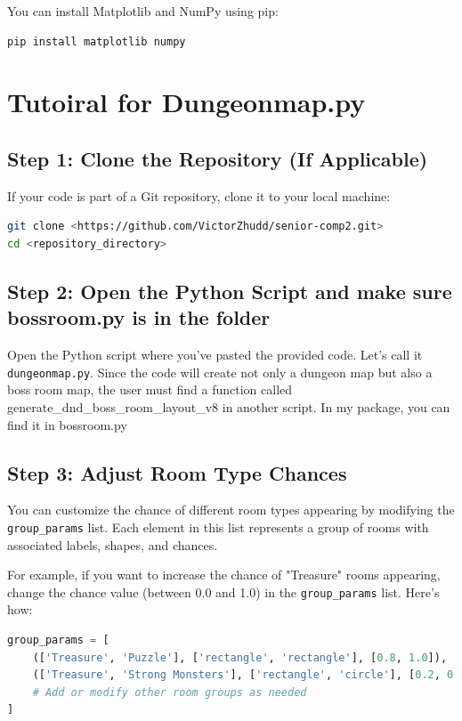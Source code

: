 \documentclass[10pt,twocolumn]{article}
\begin{document}
You can install Matplotlib and NumPy using pip:

\begin{lstlisting}[language=bash]
pip install matplotlib numpy
\end{lstlisting}
\section{Tutoiral for Dungeonmap.py}
\subsection{Step 1: Clone the Repository (If Applicable)}

If your code is part of a Git repository, clone it to your local machine:

\begin{lstlisting}[language=bash]
git clone <https://github.com/VictorZhudd/senior-comp2.git>
cd <repository_directory>
\end{lstlisting}

\subsection{Step 2: Open the Python Script and make sure bossroom.py is in the folder}

Open the Python script where you've pasted the provided code. Let's call it \texttt{dungeonmap.py}. Since the code will create not only a dungeon map but also a boss room map, the user must find a function called generate\_dnd\_boss\_room\_layout\_v8 in another script. In my package, you can find it in bossroom.py

\subsection{Step 3: Adjust Room Type Chances}

You can customize the chance of different room types appearing by modifying the \texttt{group\_params} list. Each element in this list represents a group of rooms with associated labels, shapes, and chances.

For example, if you want to increase the chance of "Treasure" rooms appearing, change the chance value (between 0.0 and 1.0) in the \texttt{group\_params} list. Here's how:

\begin{lstlisting}[language=Python]
group_params = [
    (['Treasure', 'Puzzle'], ['rectangle', 'rectangle'], [0.8, 1.0]),  # Increase chance for 'Treasure'
    (['Treasure', 'Strong Monsters'], ['rectangle', 'circle'], [0.2, 0.6]),
    # Add or modify other room groups as needed
]
\end{lstlisting}
\end{document}
